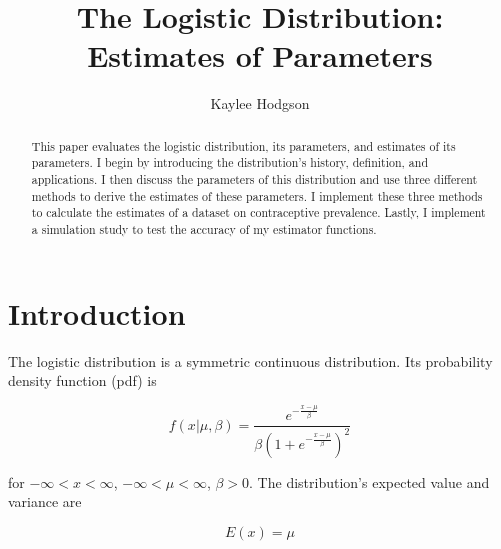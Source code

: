 \documentclass{svproc}
\begin{document}
\mainmatter              %
%
\title{The Logistic Distribution: 
\\
Estimates of Parameters}
%
%
\author{Kaylee Hodgson}
%
%

\maketitle              %

\begin{abstract}
This paper evaluates the logistic distribution, its parameters, and estimates of its parameters. I begin by introducing the distribution's history, definition, and applications. I then discuss the parameters of this distribution and use three different methods to derive the estimates of these parameters. I implement these three methods to calculate the estimates of a dataset on contraceptive prevalence. Lastly, I implement a simulation study to test the accuracy of my estimator functions.
\end{abstract}
%
\section{Introduction}

The logistic distribution is a symmetric continuous distribution. Its probability density function (pdf) is

\begin{equation}
f(x| \mu,\beta) = \frac{e^{-\frac{x-\mu }{\beta }}}{\beta (1+e^{-\frac{x-\mu }{\beta }})^2}
\label{1.1}
\end{equation}

\bigskip

for $-\infty < x < \infty$, $-\infty < \mu < \infty$, $\beta > 0$. The distribution's expected value and variance are

\begin{equation}
E(x) = \mu
\label{1.2}
\end{equation}
\end{document}
